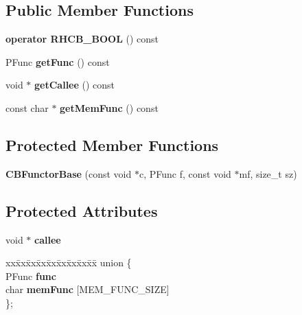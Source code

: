 \subsection*{Public Member Functions}
\begin{DoxyCompactItemize}
\item 
{\bfseries operator R\+H\+C\+B\+\_\+\+B\+O\+OL} () const \label{classCBFunctorBase_af34a298bd07b00a2c7a89c98e7b96f79}

\item 
P\+Func {\bfseries get\+Func} () const \label{classCBFunctorBase_a6429f4fb4cedd4d37f9dac39e93e4e21}

\item 
void $\ast$ {\bfseries get\+Callee} () const \label{classCBFunctorBase_a914255b831c1278ba0587b7496a08313}

\item 
const char $\ast$ {\bfseries get\+Mem\+Func} () const \label{classCBFunctorBase_a360081a2dde017999e385eff7448be64}

\end{DoxyCompactItemize}
\subsection*{Protected Member Functions}
\begin{DoxyCompactItemize}
\item 
{\bfseries C\+B\+Functor\+Base} (const void $\ast$c, P\+Func f, const void $\ast$mf, size\+\_\+t sz)\label{classCBFunctorBase_ad26c29cddb39d6b9767c2d04f9490e65}

\end{DoxyCompactItemize}
\subsection*{Protected Attributes}
\begin{DoxyCompactItemize}
\item 
void $\ast$ {\bfseries callee}\label{classCBFunctorBase_a4350b45a3bc31a07ef188c61ee7af584}

\item 
\begin{tabbing}
xx\=xx\=xx\=xx\=xx\=xx\=xx\=xx\=xx\=\kill
union \{\\
\>PFunc {\bfseries func}\\
\>char {\bfseries memFunc} [MEM\_FUNC\_SIZE]\\
\}; \label{classCBFunctorBase_af130b02d1cd0d194b552c70725830164}
\\

\end{tabbing}\end{DoxyCompactItemize}
